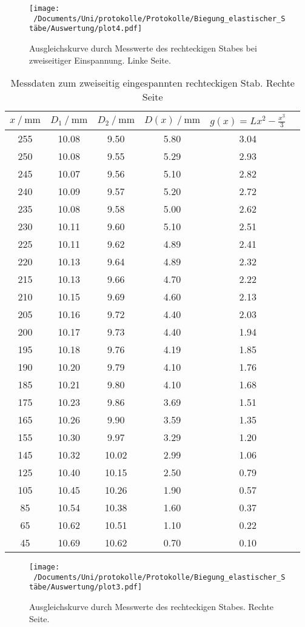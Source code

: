 \begin{figure}
  \centering
  \texttt{[image: ~/Documents/Uni/protokolle/Protokolle/Biegung\_elastischer\_Stäbe/Auswertung/plot4.pdf]}
  \caption{Ausgleichskurve durch Messwerte des rechteckigen Stabes bei zweiseitiger Einspannung. Linke Seite.}
  \label{fig:kurveRechtlinks}
\end{figure}


\begin{table}
  \centering
  \caption{Messdaten zum zweiseitig eingespannten rechteckigen Stab. Rechte Seite}
  \label{tab:zweiwerte}
  \begin{tabular}{c c c c c c}
    \toprule
      $x\:/\:\si{\milli\meter}$ & $D_1\:/\:\si{\milli\meter}$ & $D_2\:/\:\si{\milli\meter}$ & $D(x)\:/\:\si{\milli\meter}$ & $g(x)=Lx^2-\frac{x^3}{3}$ \\
    \midrule
    255 & 10.08 & 9.50 & 5.80 & 3.04 \\
    250 & 10.08 & 9.55 & 5.29 & 2.93 \\
    245 & 10.07 & 9.56 & 5.10 & 2.82 \\
    240 & 10.09 & 9.57 & 5.20 & 2.72 \\
    235 & 10.08 & 9.58 & 5.00 & 2.62 \\
    230 & 10.11 & 9.60 & 5.10 & 2.51 \\
    225 & 10.11 & 9.62 & 4.89 & 2.41 \\
    220 & 10.13 & 9.64 & 4.89 & 2.32 \\
    215 & 10.13 & 9.66 & 4.70 & 2.22 \\
    210 & 10.15 & 9.69 & 4.60 & 2.13 \\
    205 & 10.16 & 9.72 & 4.40 & 2.03 \\
    200 & 10.17 & 9.73 & 4.40 & 1.94 \\
    195 & 10.18 & 9.76 & 4.19 & 1.85 \\
    190 & 10.20 & 9.79 & 4.10 & 1.76 \\
    185 & 10.21 & 9.80 & 4.10 & 1.68 \\
    175 & 10.23 & 9.86 & 3.69 & 1.51 \\
    165 & 10.26 & 9.90 & 3.59 & 1.35 \\
    155 & 10.30 & 9.97 & 3.29 & 1.20 \\
    145 & 10.32 & 10.02 & 2.99 & 1.06 \\
    125 & 10.40 & 10.15 & 2.50 & 0.79 \\
    105 & 10.45 & 10.26 & 1.90 & 0.57 \\
    85 & 10.54 & 10.38 & 1.60 & 0.37 \\
    65 & 10.62 & 10.51 & 1.10 & 0.22 \\
    45 & 10.69 & 10.62 & 0.70 & 0.10 \\
    \bottomrule
  \end{tabular}
\end{table}

\begin{figure}
  \centering
  \texttt{[image: ~/Documents/Uni/protokolle/Protokolle/Biegung\_elastischer\_Stäbe/Auswertung/plot3.pdf]}
  \caption{Ausgleichskurve durch Messwerte des rechteckigen Stabes. Rechte Seite.}
  \label{fig:kurveRechtrechts}
\end{figure}

